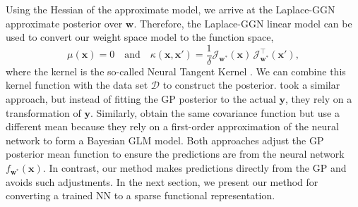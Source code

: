 \documentclass{article}
\newcommand{\dataset}{\ensuremath{\mathcal{D}}}
\newcommand{\weights}{\ensuremath{\mathbf{w}}}
\newcommand{\mbf}[1]{\mathbf{#1}}
\newcommand{\vx}{\mbf{x}}
\newcommand{\vy}{\mbf{y}}
\newcommand{\vw}{\mbf{w}}
\newcommand{\Jac}[2]{\mathcal{J}_{#1}(#2)}
\newcommand{\JacT}[2]{\mathcal{J}_{#1}^\top(#2)}
\newcommand{\GP}{\mathcal{GP}}
\begin{document}
Using the Hessian of the approximate model, we arrive at the Laplace-GGN approximate posterior over $\vw$.
Therefore, the Laplace-GGN linear model can be used to convert our weight space model to the function space,
\begin{equation}
\label{eq-laplace-approx-function-space}
  \mu(\vx) =  0 \quad \text{and} \quad
  \kappa(\vx, \vx')
  = \frac{1}{\delta} \Jac{\weights^*}{\vx} \, \JacT{\weights^*}{\vx'},
\end{equation}
where the kernel is the so-called Neural Tangent Kernel \citep[NTK,][]{jacot2018neural}.
We can combine this kernel function with the data set $\dataset$ to construct the posterior.
%
\citet{khan2019approximate} took a similar approach, but instead of fitting the GP posterior to the actual $\vy$, they rely on a transformation of $\vy$. Similarly, \citet{immer2021improving} obtain the same covariance function but use a different mean because they rely on a first-order approximation of the neural network to form a Bayesian GLM model. Both approaches adjust the GP posterior mean function to ensure the predictions are from the neural network $f_{\vw^*}(\vx)$.
In contrast, our method makes predictions directly from the GP and avoids such adjustments.
In the next section, we present our method for converting a trained NN to a sparse functional representation.



\newpage
\end{document}
